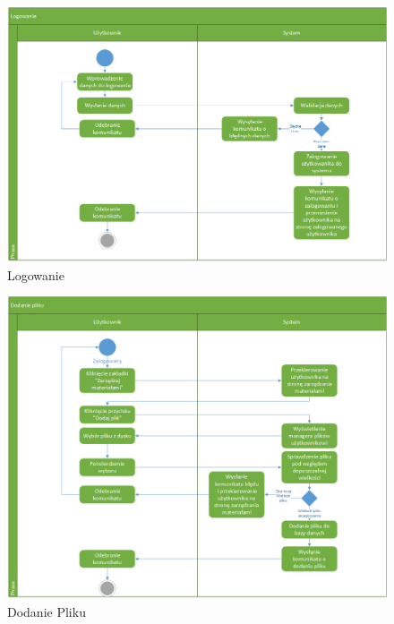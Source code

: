 	\begin{figure}[H]
	\centering
	\includegraphics[scale=0.5]{Logowanie}
	\caption{\label{fig:activity_02}Logowanie}
	\end{figure}
	\begin{figure}[H]
	\centering
	\includegraphics[scale=0.5]{DodaniePliku}
	\caption{\label{fig:activity_03}Dodanie Pliku}
	\end{figure}
